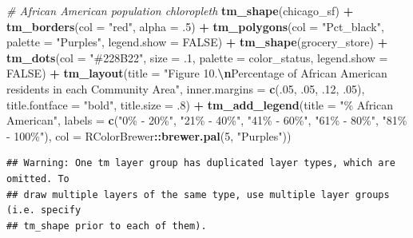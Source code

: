 \documentclass[
]{article}
\newenvironment{Shaded}{\begin{snugshade}}{\end{snugshade}}
\newcommand{\AttributeTok}[1]{\textcolor[rgb]{0.13,0.29,0.53}{#1}}
\newcommand{\CommentTok}[1]{\textcolor[rgb]{0.56,0.35,0.01}{\textit{#1}}}
\newcommand{\ConstantTok}[1]{\textcolor[rgb]{0.56,0.35,0.01}{#1}}
\newcommand{\DecValTok}[1]{\textcolor[rgb]{0.00,0.00,0.81}{#1}}
\newcommand{\FunctionTok}[1]{\textcolor[rgb]{0.13,0.29,0.53}{\textbf{#1}}}
\newcommand{\NormalTok}[1]{#1}
\newcommand{\SpecialCharTok}[1]{\textcolor[rgb]{0.81,0.36,0.00}{\textbf{#1}}}
\newcommand{\StringTok}[1]{\textcolor[rgb]{0.31,0.60,0.02}{#1}}
\begin{document}
\begin{Shaded}
\begin{Highlighting}[]
\CommentTok{\# African American population chloropleth}
\FunctionTok{tm\_shape}\NormalTok{(chicago\_sf) }\SpecialCharTok{+}
  \FunctionTok{tm\_borders}\NormalTok{(}\AttributeTok{col =} \StringTok{"red"}\NormalTok{, }\AttributeTok{alpha =}\NormalTok{ .}\DecValTok{5}\NormalTok{) }\SpecialCharTok{+}
  \FunctionTok{tm\_polygons}\NormalTok{(}\AttributeTok{col =} \StringTok{"Pct\_black"}\NormalTok{,}
              \AttributeTok{palette =} \StringTok{"Purples"}\NormalTok{,}
              \AttributeTok{legend.show =} \ConstantTok{FALSE}\NormalTok{) }\SpecialCharTok{+}
  \FunctionTok{tm\_shape}\NormalTok{(grocery\_store) }\SpecialCharTok{+}
  \FunctionTok{tm\_dots}\NormalTok{(}\AttributeTok{col =} \StringTok{"\#228B22"}\NormalTok{,}
          \AttributeTok{size =}\NormalTok{ .}\DecValTok{1}\NormalTok{,}
          \AttributeTok{palette =}\NormalTok{ color\_status,}
          \AttributeTok{legend.show =} \ConstantTok{FALSE}\NormalTok{) }\SpecialCharTok{+}
  \FunctionTok{tm\_layout}\NormalTok{(}\AttributeTok{title =} \StringTok{"Figure 10.}\SpecialCharTok{\textbackslash{}n}\StringTok{Percentage of African American residents in each Community Area"}\NormalTok{,}
            \AttributeTok{inner.margins =} \FunctionTok{c}\NormalTok{(.}\DecValTok{05}\NormalTok{, .}\DecValTok{05}\NormalTok{, .}\DecValTok{12}\NormalTok{, .}\DecValTok{05}\NormalTok{),}
            \AttributeTok{title.fontface =} \StringTok{"bold"}\NormalTok{,}
            \AttributeTok{title.size =}\NormalTok{ .}\DecValTok{8}\NormalTok{) }\SpecialCharTok{+}
  \FunctionTok{tm\_add\_legend}\NormalTok{(}\AttributeTok{title =} \StringTok{"\% African American"}\NormalTok{,}
                \AttributeTok{labels =} \FunctionTok{c}\NormalTok{(}\StringTok{"0\% {-} 20\%"}\NormalTok{,}
                           \StringTok{"21\% {-} 40\%"}\NormalTok{,}
                           \StringTok{"41\% {-} 60\%"}\NormalTok{,}
                           \StringTok{"61\% {-} 80\%"}\NormalTok{,}
                           \StringTok{"81\% {-} 100\%"}\NormalTok{),}
                \AttributeTok{col =}\NormalTok{ RColorBrewer}\SpecialCharTok{::}\FunctionTok{brewer.pal}\NormalTok{(}\DecValTok{5}\NormalTok{, }\StringTok{"Purples"}\NormalTok{))}
\end{Highlighting}
\end{Shaded}

\begin{verbatim}
## Warning: One tm layer group has duplicated layer types, which are omitted. To
## draw multiple layers of the same type, use multiple layer groups (i.e. specify
## tm_shape prior to each of them).
\end{verbatim}
\end{document}
